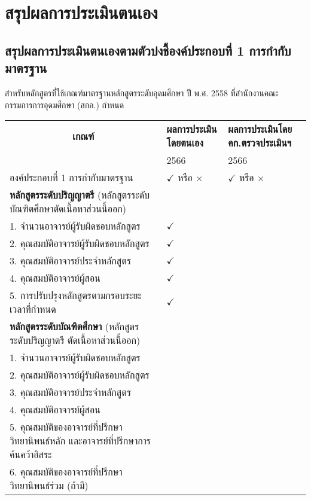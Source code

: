 \chapter{สรุปผลการประเมินตนเอง}

\section{สรุปผลการประเมินตนเองตามตัวบ่งชี้องค์ประกอบที่ 1 การกำกับมาตรฐาน}

สำหรับหลักสูตรที่ใช้เกณฑ์มาตรฐานหลักสูตรระดับอุดมศึกษา ปี พ.ศ. 2558 ที่สำนักงานคณะกรรมการการอุดมศึกษา (สกอ.) กำหนด
{\small
	\begin{longtable}{|p{}|p{}|p{}|}
		\hline
\multicolumn{1}{|c|}{\textbf{เกณฑ์}}&
		\textbf{ผลการประเมินโดยตนเอง}&
		\textbf{ผลการประเมินโดย คก.ตรวจประเมินฯ}\\\cline{2-3}
		&2566&2566\\\hline
\endhead
		องค์ประกอบที่ 1 การกำกับมาตรฐาน& $\checkmark$ หรือ $\times$&$\checkmark$ หรือ $\times$\\\hline
		\textbf{หลักสูตรระดับปริญญาตรี}\newline
		(หลักสูตรระดับบัณฑิตศึกษาตัดเนื้อหาส่วนนี้ออก)&&\\\hline
		1. จำนวนอาจารย์ผู้รับผิดชอบหลักสูตร	&$\checkmark$&\\\hline
		2. คุณสมบัติอาจารย์ผู้รับผิดชอบหลักสูตร	&$\checkmark$&\\\hline
	3. คุณสมบัติอาจารย์ประจำหลักสูตร&$\checkmark$&\\\hline
	4. คุณสมบัติอาจารย์ผู้สอน	&$\checkmark$&\\\hline	
		5. การปรับปรุงหลักสูตรตามกรอบระยะเวลาที่กำหนด	&$\checkmark$&\\\hline
		\textbf{หลักสูตรระดับบัณฑิตศึกษา}\newline
		(หลักสูตรระดับปริญญาตรี ตัดเนื้อหาส่วนนี้ออก)&&	\\\hline	
		1. จำนวนอาจารย์ผู้รับผิดชอบหลักสูตร	&&	\\\hline	
		2. คุณสมบัติอาจารย์ผู้รับผิดชอบหลักสูตร	&&	\\\hline	
		3. คุณสมบัติอาจารย์ประจำหลักสูตร	&&	\\\hline	
		4. คุณสมบัติอาจารย์ผู้สอน		&&	\\\hline
		5. คุณสมบัติของอาจารย์ที่ปรึกษาวิทยานิพนธ์หลัก\newline\hspace*{0.3cm} และอาจารย์ที่ปรึกษาการค้นคว้าอิสระ&&	\\\hline		
		6. คุณสมบัติของอาจารย์ที่ปรึกษาวิทยานิพนธ์ร่วม\newline\hspace*{0.3cm} (ถ้ามี)&&	\\\hline		

\end{longtable}}
